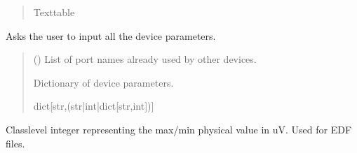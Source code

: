 \documentclass[letterpaper,10pt,english]{sphinxmanual}
\begin{document}
\begin{fulllineitems}
\begin{fulllineitems}
\begin{quote}
\begin{description}
\sphinxAtStartPar
Texttable

\end{description}\end{quote}

\end{fulllineitems}


\begin{fulllineitems}
\label{\detokenize{Setup.SetupOneDevice:Setup.SetupOneDevice.Setup_8206HR.Setup8206HR._GetParam_onePODdevice}}
\pysigstartsignatures
{}
\pysigstopsignatures
\sphinxAtStartPar
Asks the user to input all the device parameters.
\begin{quote}\begin{description}
\sphinxAtStartPar
{} (\sphinxstyleliteralemphasis{\sphinxupquote{{[}}}\sphinxstyleliteralemphasis{\sphinxupquote{{]}}}) \textendash{} List of port names already used by other devices.

\sphinxAtStartPar
Dictionary of device parameters.

\sphinxAtStartPar
dict{[}str,(str|int|dict{[}str,int{]}){]}

\end{description}\end{quote}

\end{fulllineitems}


\begin{fulllineitems}
\label{\detokenize{Setup.SetupOneDevice:Setup.SetupOneDevice.Setup_8206HR.Setup8206HR._PHYSICAL_BOUND_uV}}
\pysigstartsignatures
{}
\pysigstopsignatures
\sphinxAtStartPar
Class\sphinxhyphen{}level integer representing the max/\sphinxhyphen{}min physical value in uV.     Used for EDF files.


\end{fulllineitems}
\end{fulllineitems}
\end{document}
